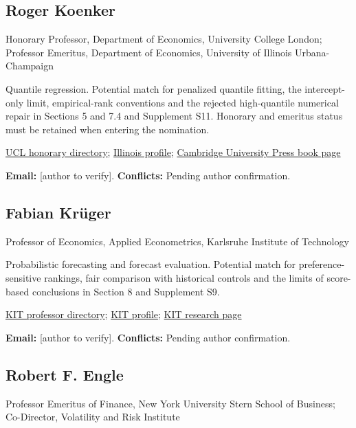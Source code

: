 \documentclass[11pt,a4paper]{article}
\begin{document}
\subsection*{Roger Koenker}

Honorary Professor, Department of Economics, University College London; Professor Emeritus, Department of Economics, University of Illinois Urbana-Champaign

Quantile regression. Potential match for penalized quantile fitting, the intercept-only limit, empirical-rank conventions and the rejected high-quantile numerical repair in Sections 5 and 7.4 and Supplement S11. Honorary and emeritus status must be retained when entering the nomination.

\href{https://www.ucl.ac.uk/social-historical-sciences/economics/our-staff/honorary-staff}{UCL honorary directory}; \href{https://economics.illinois.edu/profile/rkoenker}{Illinois profile}; \href{https://www.cambridge.org/core/books/quantile-regression/C18AE7BCF3EC43C16937390D44A328B1}{Cambridge University Press book page}

\textbf{Email:} [author to verify]. \textbf{Conflicts:} Pending author confirmation.

\subsection*{Fabian Krüger}

Professor of Economics, Applied Econometrics, Karlsruhe Institute of Technology

Probabilistic forecasting and forecast evaluation. Potential match for preference-sensitive rankings, fair comparison with historical controls and the limits of score-based conclusions in Section 8 and Supplement S9.

\href{https://www.wiwi.kit.edu/english/professors.php}{KIT professor directory}; \href{https://ewifo.stat.kit.edu/english/21_57.php}{KIT profile}; \href{https://ewifo.stat.kit.edu/english/26.php}{KIT research page}

\textbf{Email:} [author to verify]. \textbf{Conflicts:} Pending author confirmation.

\subsection*{Robert F. Engle}

Professor Emeritus of Finance, New York University Stern School of Business; Co-Director, Volatility and Risk Institute
\end{document}
